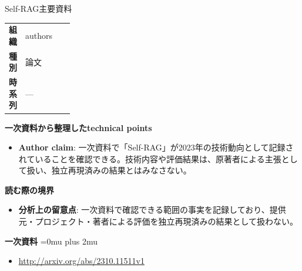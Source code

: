 \begin{technicalnote}{Self-RAG}{主要資料}
\begingroup
\begin{tabularx}{\linewidth}{@{}>{\bfseries}p{0.22\linewidth}X@{}}
組織 & authors \\
種別 & 論文 \\
時系列 & — \\
\end{tabularx}
\smallskip
{\bfseries 一次資料から整理したtechnical points}
\begin{itemize}[leftmargin=1.5em,itemsep=0.35em]
\item \textbf{Author claim}: 一次資料で「Self-RAG」が2023年の技術動向として記録されていることを確認できる。技術内容や評価結果は、原著者による主張として扱い、独立再現済みの結果とはみなさない。
\end{itemize}
\begin{minipage}{\linewidth}
{\bfseries 読む際の境界}
\begin{itemize}[leftmargin=1.5em,itemsep=0.35em]
\item \textbf{分析上の留意点}: 一次資料で確認できる範囲の事実を記録しており、提供元・プロジェクト・著者による評価を独立再現済みの結果として扱わない。
\end{itemize}
\begin{samepage}
{\bfseries 一次資料}
\begingroup\sloppy
\Urlmuskip=0mu plus 2mu\relax
\begin{itemize}[leftmargin=1.5em,itemsep=0.25em]
\item {\scriptsize\url{http://arxiv.org/abs/2310.11511v1}}
\end{itemize}
\endgroup
\end{samepage}
\end{minipage}
\endgroup
\end{technicalnote}
\medskip

